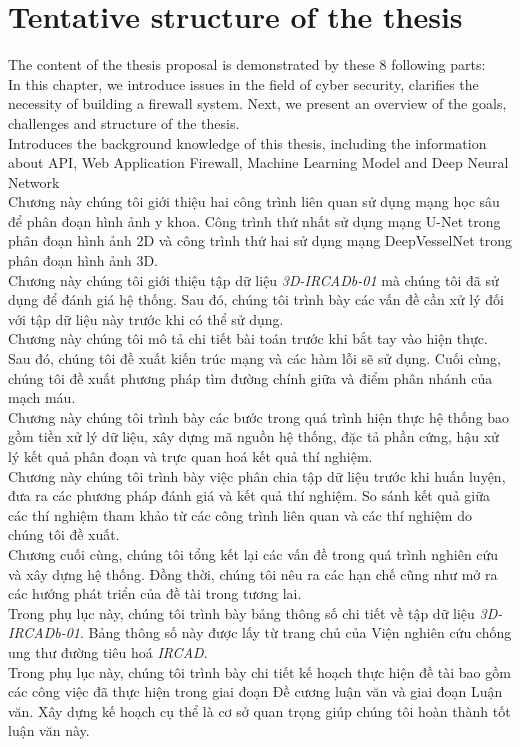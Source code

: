 \section{Tentative structure of the thesis}
\label{sec:structure}
	\newcommand\nextintro{\\[4mm]}
	The content of the thesis proposal is demonstrated by these 8 following parts: \nextintro
	 In this chapter, we introduce issues in the field of cyber security, clarifies the necessity of building a firewall system. Next, we present an overview of the goals, challenges and structure of the thesis.\nextintro
	 Introduces the background knowledge of this thesis, including the information about API, Web Application Firewall, Machine Learning Model and Deep Neural Network\nextintro
	 Chương này chúng tôi giới thiệu hai công trình liên quan sử dụng mạng học sâu để phân đoạn hình ảnh y khoa. Công trình thứ nhất sử dụng mạng U-Net trong phân đoạn hình ảnh 2D và công trình thứ hai sử dụng mạng DeepVesselNet trong phân đoạn hình ảnh 3D.\nextintro
	 Chương này chúng tôi giới thiệu tập dữ liệu \textit{3D-IRCADb-01} mà chúng tôi đã sử dụng để đánh giá hệ thống. Sau đó, chúng tôi trình bày các vấn đề cần xử lý đối với tập dữ liệu này trước khi có thể sử dụng.\nextintro
	 Chương này chúng tôi mô tả chi tiết bài toán trước khi bắt tay vào hiện thực. Sau đó, chúng tôi đề xuất kiến trúc mạng và các hàm lỗi sẽ sử dụng. Cuối cùng, chúng tôi đề xuất phương pháp tìm đường chính giữa và điểm phân nhánh của mạch máu.\nextintro
	 Chương này chúng tôi trình bày các bước trong quá trình hiện thực hệ thống bao gồm tiền xử lý dữ liệu, xây dựng mã nguồn hệ thống, đặc tả phần cứng, hậu xử lý kết quả phân đoạn và trực quan hoá kết quả thí nghiệm.\nextintro
	 Chương này chúng tôi trình bày việc phân chia tập dữ liệu trước khi huấn luyện, đưa ra các phương pháp đánh giá và kết quả thí nghiệm. So sánh kết quả giữa các thí nghiệm tham khảo từ các công trình liên quan và các thí nghiệm do chúng tôi đề xuất.\nextintro
	 Chương cuối cùng, chúng tôi tổng kết lại các vấn đề trong quá trình nghiên cứu và xây dựng hệ thống. Đồng thời, chúng tôi nêu ra các hạn chế cũng như mở ra các hướng phát triển của đề tài trong tương lai.\nextintro
	 Trong phụ lục này, chúng tôi trình bày bảng thông số chi tiết về tập dữ liệu \textit{3D-IRCADb-01}. Bảng thông số này được lấy từ trang chủ của Viện nghiên cứu chống ung thư đường tiêu hoá \textit{IRCAD}. \nextintro
	 Trong phụ lục này, chúng tôi trình bày chi tiết kế hoạch thực hiện đề tài bao gồm các công việc đã thực hiện trong giai đoạn Đề cương luận văn và giai đoạn Luận văn. Xây dựng kế hoạch cụ thể là cơ sở quan trọng giúp chúng tôi hoàn thành tốt luận văn này.
